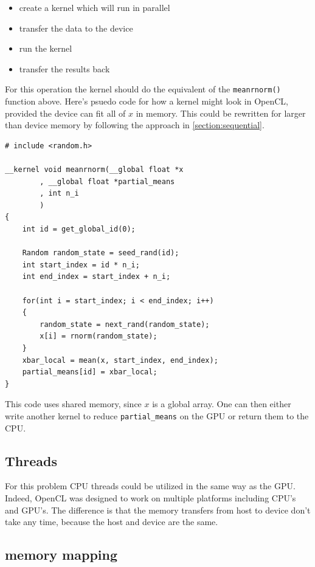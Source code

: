 \documentclass[12pt]{article}
\begin{document}
\begin{itemize}
    \item create a kernel which will run in parallel
    \item transfer the data to the device
    \item run the kernel
    \item transfer the results back
\end{itemize}

For this operation the kernel should do the equivalent of the
\texttt{meanrnorm()} function above.  Here's psuedo code for how a kernel
might look in OpenCL, provided the device can fit all of $x$ in memory.
This could be rewritten for larger than device memory by following the
approach in \ref{section:sequential}.

\begin{verbatim}
# include <random.h>

__kernel void meanrnorm(__global float *x
        , __global float *partial_means
        , int n_i
        )
{
    int id = get_global_id(0);

    Random random_state = seed_rand(id);
    int start_index = id * n_i;
    int end_index = start_index + n_i;

    for(int i = start_index; i < end_index; i++)
    {
        random_state = next_rand(random_state);
        x[i] = rnorm(random_state);
    }
    xbar_local = mean(x, start_index, end_index);
    partial_means[id] = xbar_local;
}
\end{verbatim}

This code uses shared memory, since $x$ is a global array.
One can then either write another kernel to reduce
\texttt{partial\_means} on the GPU or return them to the CPU.

\subsection{Threads}

For this problem CPU threads could be utilized in the same way as the GPU.
Indeed, OpenCL was designed to work on multiple platforms including CPU's
and GPU's. The difference is that the memory transfers from host to device
don't take any time, because the host and device are the same.

\subsection{memory mapping}
\end{document}
